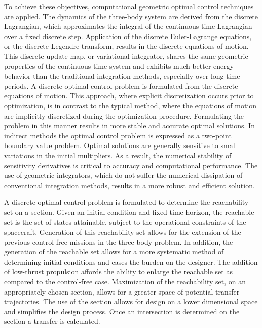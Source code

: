 To achieve these objectives, computational geometric optimal control techniques are applied. 
The dynamics of the three-body system are derived from the discrete Lagrangian, which approximates the integral of the continuous time Lagrangian over a fixed discrete step.
Application of the discrete Euler-Lagrange equations, or the discrete Legendre transform, results in the discrete equations of motion.
This discrete update map, or variational integrator, shares the same geometric properties of the continuous time system and exhibits much better energy behavior than the traditional integration methods, especially over long time periods.
A discrete optimal control problem is formulated from the discrete equations of motion.
This approach, where explicit discretization occurs prior to optimization,  is in contrast to the typical method, where the equations of motion are implicitly discretized during the optimization procedure.
Formulating the problem in this manner results in more stable and accurate optimal solutions. 
In indirect methods the optimal control problem is expressed as a two-point boundary value problem.
Optimal solutions are generally sensitive to small variations in the initial multipliers.
As a result, the numerical stability of sensitivity derivatives is critical to accuracy and computational performance. 
The use of geometric integrators, which do not suffer the numerical dissipation of conventional integration methods, results in a more robust and efficient solution.

A discrete optimal control problem is formulated to determine the reachability set on a \Poincare section.
Given an initial condition and fixed time horizon, the reachable set is the set of states attainable, subject to the operational constraints of the spacecraft. 
Generation of this reachability set allows for the extension of the previous control-free missions in the three-body problem.
In addition, the generation of the reachable set allows for a more systematic method of determining initial conditions and eases the burden on the designer. 
The addition of low-thrust propulsion affords the ability to enlarge the reachable set as compared to the control-free case.
Maximization of the reachability set, on an appropriately chosen \Poincare section, allows for a greater space of potential transfer trajectories.
The use of the \Poincare section allows for design on a lower dimensional space and simplifies the design process.
Once an intersection is determined on the \Poincare section a transfer is calculated.

